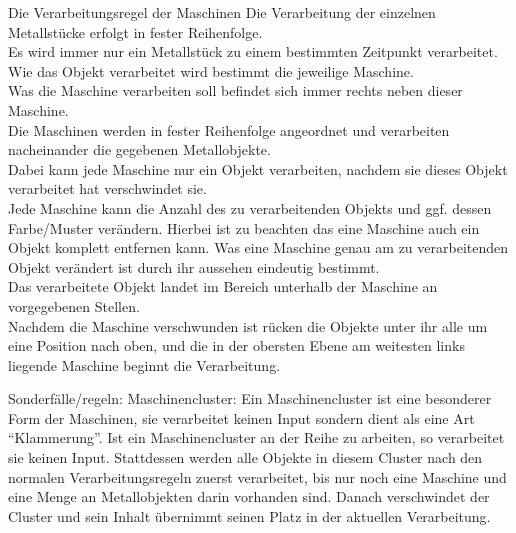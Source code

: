 \documentclass{scrartcl}
\begin{document}
\begin{description}
\begin{minipage}{1\textwidth}
	\item[Die Verarbeitungsregel der Maschinen] Die Verarbeitung der einzelnen Metallstücke erfolgt in fester Reihenfolge.\\
	Es wird immer nur ein Metallstück zu einem bestimmten Zeitpunkt verarbeitet.\\
	Wie das Objekt verarbeitet wird bestimmt die jeweilige Maschine.\\
	Was die Maschine verarbeiten soll befindet sich immer rechts neben dieser Maschine.\\
	Die Maschinen werden in fester Reihenfolge angeordnet und verarbeiten nacheinander die gegebenen Metallobjekte.\\
	Dabei kann jede Maschine nur ein Objekt verarbeiten, nachdem sie dieses Objekt verarbeitet hat verschwindet sie.\\
	Jede Maschine kann die Anzahl des zu verarbeitenden Objekts und ggf. dessen Farbe/Muster verändern. Hierbei ist zu beachten das eine Maschine auch ein Objekt komplett entfernen kann. Was eine Maschine genau am zu verarbeitenden Objekt verändert ist durch ihr aussehen eindeutig bestimmt.\\
	Das verarbeitete Objekt landet im Bereich unterhalb der Maschine an vorgegebenen Stellen.\\
	Nachdem die Maschine verschwunden ist rücken die Objekte unter ihr alle um eine Position nach oben, und die in der obersten Ebene am weitesten links liegende Maschine beginnt die Verarbeitung.\\
\end{minipage}	
	
\begin{minipage}{1\textwidth}
	\item[Sonderfälle/regeln:] Maschinencluster: Ein Maschinencluster ist eine besonderer Form der Maschinen, sie verarbeitet keinen Input sondern dient als eine Art \enquote{Klammerung}. Ist ein Maschinencluster an der Reihe zu arbeiten, so verarbeitet sie keinen Input. Stattdessen werden alle Objekte in diesem Cluster nach den normalen Verarbeitungsregeln zuerst verarbeitet, bis nur noch eine Maschine und eine Menge an Metallobjekten darin vorhanden sind. Danach verschwindet der Cluster und sein Inhalt übernimmt seinen Platz in der aktuellen Verarbeitung.\\
\end{minipage}

\end{description}
\end{document}

